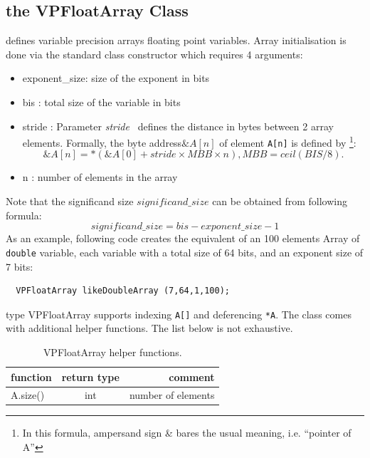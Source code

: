 \documentclass[11pt]{report}
\begin{document}
\subsection{the VPFloatArray Class} defines variable precision arrays floating point variables.
Array initialisation is done via the standard class constructor which requires 4 arguments:
\begin{itemize}
\item exponent\_size: size of the exponent in bits 
\item bis : total size of the variable in bits
\item stride : 
  Parameter \emph{stride\ } defines the distance in bytes between 2 array elements. Formally, the byte address$\&A[n]$ of element \texttt{A[n]} is defined by \footnote{In this formula, ampersand sign \& bares the usual meaning, i.e. ``pointer of A''}:
  \begin{equation}
    \&A[n] = \ast(\&A[0]+stride \times MBB \times n), MBB = ceil(BIS/8).
  \end {equation}
\item n : number of elements in the array
\end{itemize}
Note that the significand size $significand\_size$ can be obtained from following formula:
\begin{equation}
  significand\_size = bis - exponent\_size - 1  
\end{equation}
As an example, following code creates the equivalent of an 100 elements Array of \texttt{double} variable, each variable with a total size of 64 bits, and an exponent size of 7 bits:
\begin{verbatim}
  VPFloatArray likeDoubleArray (7,64,1,100);
\end{verbatim}
type VPFloatArray supports indexing \texttt{A[]} and  deferencing \texttt{*A}.
The class comes with additional helper functions. The list below is not exhaustive.
\begin{table}[h!]
  \begin{center}
    \caption{VPFloatArray helper functions.}
    \label{tab:table2}
    \begin{tabular}{l|c|r} %
      \textbf{function} & \textbf{return type} & \textbf{comment}\\
      \hline
      A.size() & int & number of elements\\
      \hline
    \end{tabular}
  \end{center}
\end{table}
\end{document}
